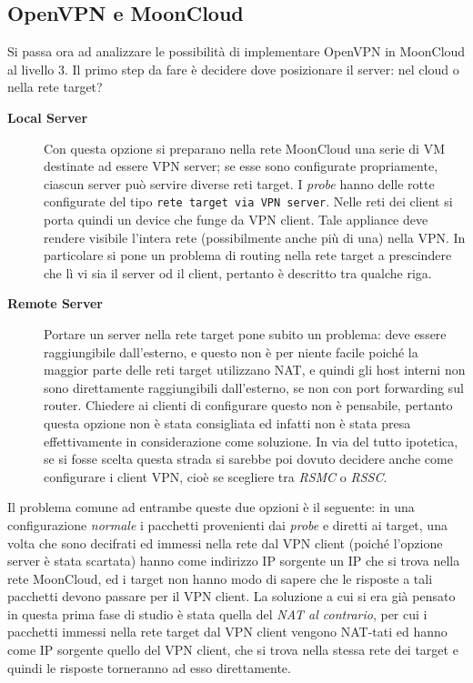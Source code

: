 \subsection{OpenVPN e MoonCloud}
Si passa ora ad analizzare le possibilità di implementare OpenVPN in MoonCloud al livello 3. Il primo step
da fare è decidere dove posizionare il server: nel cloud o nella rete target?
\begin{description}
	\item[\textbf{Local Server}]Con questa opzione si preparano nella rete MoonCloud una serie
	di VM destinate ad essere VPN server; se esse sono configurate propriamente, ciascun server
	può servire diverse reti target. I \textit{probe}
	hanno delle rotte configurate del tipo \texttt{rete target via VPN server}.
	Nelle reti dei client si porta quindi un device che funge da VPN client.
	Tale appliance deve rendere visibile l'intera rete (possibilmente anche più di una) nella VPN. In
	particolare si pone un problema di routing nella rete target a prescindere che lì vi sia
	il server od il client, pertanto è descritto tra qualche riga.
	\item[\textbf{Remote Server}]Portare un server nella rete target pone subito un problema: deve
	essere raggiungibile dall'esterno, e questo non è per niente facile poiché la maggior parte
	delle reti target utilizzano NAT, e quindi gli host interni non sono direttamente raggiungibili
	dall'esterno, se non con port forwarding sul router. Chiedere ai clienti di configurare
	questo non è pensabile, pertanto questa opzione non è stata consigliata ed infatti
	non è stata presa effettivamente in considerazione come soluzione.
	In via del tutto ipotetica, se si fosse scelta questa strada si sarebbe poi
	dovuto decidere anche come configurare i client VPN, cioè se scegliere tra \textit{RSMC}
	o \textit{RSSC}.
\end{description}
Il problema comune ad entrambe queste due opzioni è il seguente: in una configurazione
\textit{normale} i pacchetti provenienti dai \textit{probe} e diretti ai target, una volta che
sono decifrati ed immessi nella rete dal VPN client (poiché l'opzione server
è stata scartata) hanno come indirizzo IP sorgente un IP che si trova nella rete MoonCloud,
ed i target non hanno modo di sapere che le risposte a tali pacchetti devono passare
per il VPN client. La soluzione a cui si era già pensato in questa prima fase di studio
è stata quella del \textit{NAT al contrario}, per cui i pacchetti immessi nella rete
target dal VPN client vengono NAT-tati ed hanno come IP sorgente quello del VPN
client, che si trova nella stessa rete dei target e quindi le risposte torneranno
ad esso direttamente.

